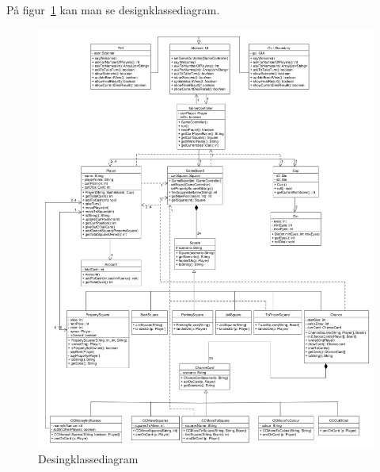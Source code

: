 \documentclass[../main.tex]{subfiles}
\begin{document}
På figur~\ref{fig:DKD} kan man se designklassediagram.
    \begin{figure}[H]
        \centering
        \includegraphics[scale = 0.3]{diagrams_png/DKD.png}
        \caption{Desingklassediagram}\label{fig:DKD}
    \end{figure}
\end{document}
